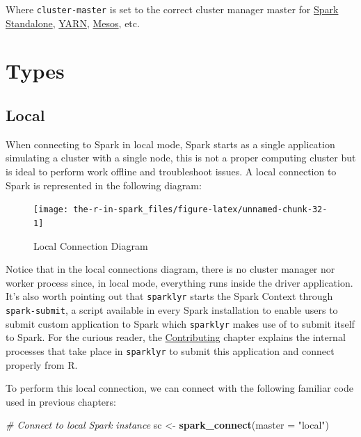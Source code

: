 \documentclass[]{book}
\newenvironment{Shaded}{\begin{snugshade}}{\end{snugshade}}
\newcommand{\CommentTok}[1]{\textcolor[rgb]{0.56,0.35,0.01}{\textit{#1}}}
\newcommand{\DataTypeTok}[1]{\textcolor[rgb]{0.13,0.29,0.53}{#1}}
\newcommand{\KeywordTok}[1]{\textcolor[rgb]{0.13,0.29,0.53}{\textbf{#1}}}
\newcommand{\NormalTok}[1]{#1}
\newcommand{\StringTok}[1]{\textcolor[rgb]{0.31,0.60,0.02}{#1}}
\theoremstyle{definition}
\theoremstyle{definition}
\theoremstyle{definition}
\theoremstyle{remark}
\begin{document}
Where \texttt{cluster-master} is set to the correct cluster manager
master for \href{Standalone}{Spark Standalone}, \href{Yarn}{YARN},
\protect\hyperlink{mesos-1}{Mesos}, etc.

\hypertarget{types}{%
\section{Types}\label{types}}

\hypertarget{local}{%
\subsection{Local}\label{local}}

When connecting to Spark in local mode, Spark starts as a single
application simulating a cluster with a single node, this is not a
proper computing cluster but is ideal to perform work offline and
troubleshoot issues. A local connection to Spark is represented in the
following diagram:

\begin{figure}

{\centering \texttt{[image: the-r-in-spark\_files/figure-latex/unnamed-chunk-32-1]} 

}

\caption{Local Connection Diagram}\label{fig:unnamed-chunk-32}
\end{figure}

Notice that in the local connections diagram, there is no cluster
manager nor worker process since, in local mode, everything runs inside
the driver application. It's also worth pointing out that
\texttt{sparklyr} starts the Spark Context through
\texttt{spark-submit}, a script available in every Spark installation to
enable users to submit custom application to Spark which
\texttt{sparklyr} makes use of to submit itself to Spark. For the
curious reader, the \protect\hyperlink{contributing}{Contributing}
chapter explains the internal processes that take place in
\texttt{sparklyr} to submit this application and connect properly from
R.

To perform this local connection, we can connect with the following
familiar code used in previous chapters:

\begin{Shaded}
\begin{Highlighting}[]
\CommentTok{# Connect to local Spark instance}
\NormalTok{sc <-}\StringTok{ }\KeywordTok{spark_connect}\NormalTok{(}\DataTypeTok{master =} \StringTok{"local"}\NormalTok{)}
\end{Highlighting}
\end{Shaded}
\end{document}
